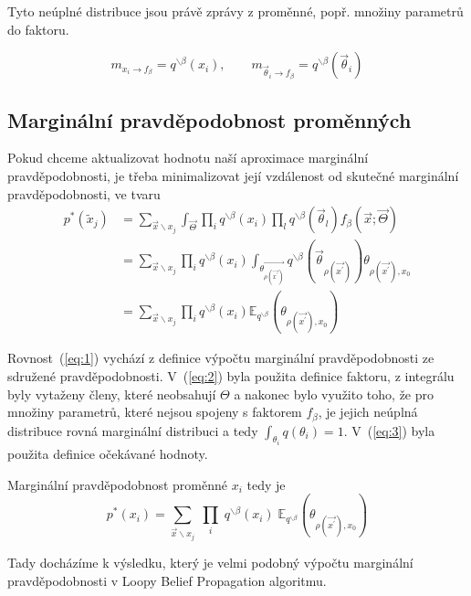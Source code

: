 Tyto neúplné distribuce jsou právě zprávy z proměnné, popř. množiny parametrů do faktoru.

$$m_{x_i \rightarrow f_\beta} = q^{\backslash \beta}(x_i), 
\quad \quad
m_{\vec\theta_i \rightarrow f_\beta} = q^{\backslash \beta}(\vec\theta_i)$$

\subsection{Marginální pravděpodobnost proměnných}

Pokud chceme aktualizovat hodnotu naší aproximace marginální pravděpodobnosti,
je třeba minimalizovat její vzdálenost od skutečné marginální
pravděpodobnosti, ve tvaru
\begin{align}
p^*(\tilde{x}_j) &=
\sum_{\vec{x} \backslash x_j}
	\int_{\vec{\Theta}}
    		\prod_i 
			q^{\backslash \beta}(x_i)
		\prod_l 
			q^{\backslash \beta}(\vec{\theta}_l)
		f_\beta(\vec{x};
    		  \vec{\Theta})
\label{eq:1} 
\\
&=
\sum_{\vec{x} \backslash x_j} 
	\prod_i 
		q^{\backslash \beta}(x_i)
    \int_{\vec{\theta_{\rho(\vec{x^\prime})}}}
	    q^{\backslash \beta}(\vec{\theta}_{\rho(\vec{x^\prime})})
    \theta_{\rho(\vec{x^\prime}), x_0} \label{eq:2} 
\\
&= 
\sum_{\vec{x} \backslash x_j} 
	\prod_i 
		q^{\backslash \beta}(x_i)
    		\mathbb{E}_{q^{\backslash \beta}} 
			(\theta_{\rho(\vec{x^\prime}), x_0}) 
\label{eq:3}
\end{align}

Rovnost~(\ref{eq:1}) vychází z definice výpočtu marginální pravděpodobnosti ze
sdružené pravděpodobnosti.
V~(\ref{eq:2}) byla použita definice faktoru, z integrálu byly vytaženy členy,
které neobsahují $\Theta$ a nakonec bylo využito toho, že pro
množiny parametrů, které nejsou spojeny s faktorem $f_\beta$, je jejich neúplná
distribuce rovná marginální distribuci a tedy $\int_{\theta_i} q(\theta_i) =
1$. V~(\ref{eq:3}) byla použita definice očekávané hodnoty.

Marginální pravděpodobnost proměnné $x_i$ tedy je
\begin{equation}
p^*(x_i) =
\sum_{\vec{x} \backslash x_j} \;
	\prod_i \;
		q^{\backslash \beta}(x_i)\;
    		\mathbb{E}_{q^{\backslash \beta}} 
			(\theta_{\rho(\vec{x^\prime}), x_0}) 
\end{equation}

Tady docházíme k výsledku, který je velmi podobný výpočtu marginální
pravděpodobnosti v Loopy Belief Propagation algoritmu.

